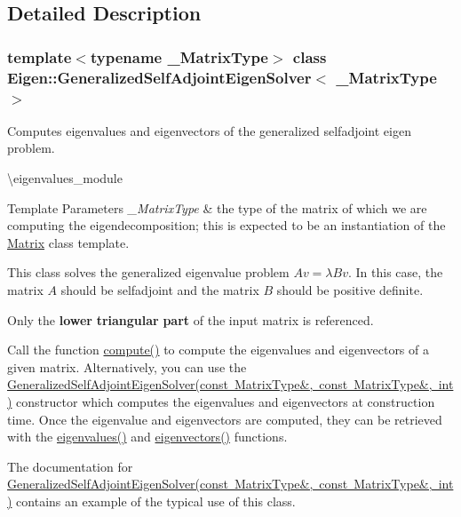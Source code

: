 \subsection{Detailed Description}
\subsubsection*{template$<$typename \+\_\+\+Matrix\+Type$>$\newline
class Eigen\+::\+Generalized\+Self\+Adjoint\+Eigen\+Solver$<$ \+\_\+\+Matrix\+Type $>$}

Computes eigenvalues and eigenvectors of the generalized selfadjoint eigen problem. 

\textbackslash{}eigenvalues\+\_\+module


\begin{DoxyTemplParams}{Template Parameters}
{\em \+\_\+\+Matrix\+Type} & the type of the matrix of which we are computing the eigendecomposition; this is expected to be an instantiation of the \mbox{\hyperlink{class_eigen_1_1_matrix}{Matrix}} class template.\\
\hline
\end{DoxyTemplParams}
This class solves the generalized eigenvalue problem $ Av = \lambda Bv $. In this case, the matrix $ A $ should be selfadjoint and the matrix $ B $ should be positive definite.

Only the {\bfseries{lower}} {\bfseries{triangular}} {\bfseries{part}} of the input matrix is referenced.

Call the function \mbox{\hyperlink{class_eigen_1_1_generalized_self_adjoint_eigen_solver_a724764fe196612b752042692156ed023}{compute()}} to compute the eigenvalues and eigenvectors of a given matrix. Alternatively, you can use the \mbox{\hyperlink{class_eigen_1_1_generalized_self_adjoint_eigen_solver_addc0409c9cb1a5ac9cbbd00efe68908e}{Generalized\+Self\+Adjoint\+Eigen\+Solver(const Matrix\+Type\&, const Matrix\+Type\&, int)}} constructor which computes the eigenvalues and eigenvectors at construction time. Once the eigenvalue and eigenvectors are computed, they can be retrieved with the \mbox{\hyperlink{class_eigen_1_1_self_adjoint_eigen_solver_a8efab27e82aa6aa0ae0c64739238c2e0}{eigenvalues()}} and \mbox{\hyperlink{class_eigen_1_1_self_adjoint_eigen_solver_a7b9f7e641fa46ac4c5f2371405c69b2b}{eigenvectors()}} functions.

The documentation for \mbox{\hyperlink{class_eigen_1_1_generalized_self_adjoint_eigen_solver_addc0409c9cb1a5ac9cbbd00efe68908e}{Generalized\+Self\+Adjoint\+Eigen\+Solver(const Matrix\+Type\&, const Matrix\+Type\&, int)}} contains an example of the typical use of this class.

